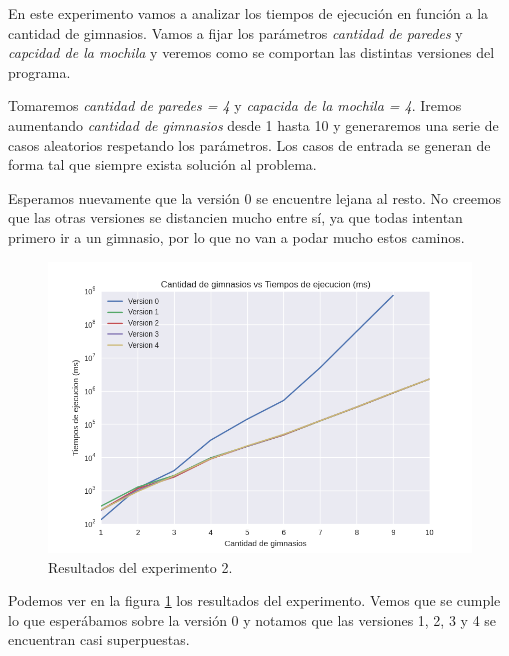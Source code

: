 \par En este experimento vamos a analizar los tiempos de ejecución en función a la cantidad de gimnasios. Vamos a fijar los parámetros \textit{cantidad de paredes} y \textit{capcidad de la mochila} y veremos como se comportan las distintas versiones del programa.

\par Tomaremos \textit{cantidad de paredes = 4} y \textit{capacida de la mochila = 4}. Iremos aumentando \textit{cantidad de gimnasios} desde 1 hasta 10 y generaremos una serie de casos aleatorios respetando los parámetros. Los casos de entrada se generan de forma tal que siempre exista solución al problema.

\par Esperamos nuevamente que la versión 0 se encuentre lejana al resto. No creemos que las otras versiones se distancien mucho entre sí, ya que todas intentan primero ir a un gimnasio, por lo que no van a podar mucho estos caminos.

\begin{figure}[H]
	\begin{center}
		\includegraphics[width=\textwidth]{img/ejercicio1/exp2_1.png}
		\caption{Resultados del experimento 2.}
		\label{fig: ej1_exp2_1}
	\end{center}
\end{figure}

\par Podemos ver en la figura \ref{fig: ej1_exp2_1} los resultados del experimento. Vemos que se cumple lo que esperábamos sobre la versión 0 y notamos que las versiones 1, 2, 3 y 4 se encuentran casi superpuestas.





